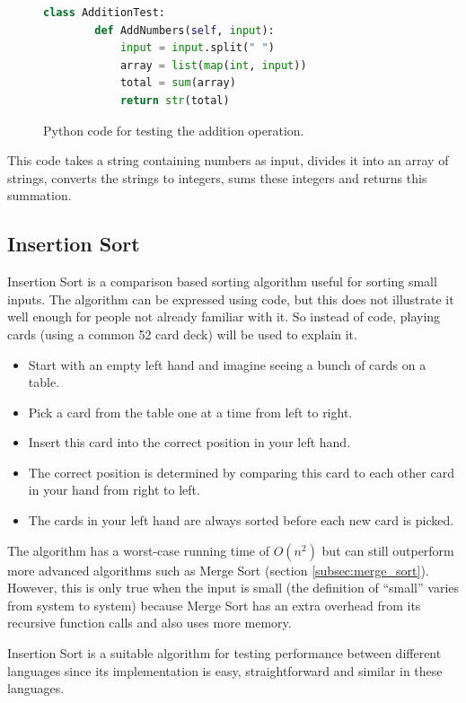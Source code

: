 \begin{figure}[h]
	\lstset{style=sharpc}
	\begin{lstlisting}[language=python]
	class AdditionTest:
	    def AddNumbers(self, input):
	        input = input.split(" ")
	        array = list(map(int, input))
	        total = sum(array)
	        return str(total)
	\end{lstlisting}
	\caption{Python code for testing the addition operation.}
	\label{fig:addition_test}
\end{figure}

This code takes a string containing numbers as input, divides it into an array of strings, converts the strings to integers, sums these integers and returns this summation.

\subsection{Insertion Sort}
Insertion Sort is a comparison based sorting algorithm useful for sorting small inputs. The algorithm can be expressed using code, but this does not illustrate it well enough for people not already familiar with it. So instead of code, playing cards (using a common 52 card deck) will be used to explain it.

\begin{itemize}
\item Start with an empty left hand and imagine seeing a bunch of cards on a table.
\item Pick a card from the table one at a time from left to right.
\item Insert this card into the correct position in your left hand.
\item The correct position is determined by comparing this card to each other card in your hand from right to left.
\item The cards in your left hand are always sorted before each new card is picked.
\end{itemize}

The algorithm has a worst-case running time of $O(n^2)$ but can still outperform more advanced algorithms such as Merge Sort (section \ref{subsec:merge_sort}). However, this is only true when the input is small (the definition of ``small'' varies from system to system) \cite{Insertionsort} because Merge Sort has an extra overhead from its recursive function calls and also uses more memory.

Insertion Sort is a suitable algorithm for testing performance between different languages since its implementation is easy, straightforward and similar in these languages.


